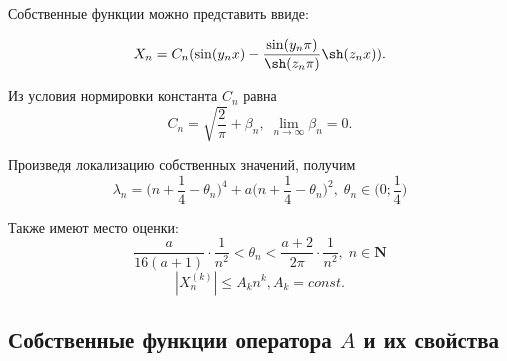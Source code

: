 \documentclass[ignorenonframetext,unicode,handout, 9pt]{beamer}
\numberwithin{equation}{section}
\begin{document}

\begin{frame}

Собственные функции можно представить ввиде:

\begin{equation}
X_n = C_n (\sin(y_n x) - \frac{\sin(y_n \pi)}{\sh(z_n \pi)} \sh(z_n x)).
\end{equation}

Из условия нормировки константа $C_n$ равна
\begin{equation}\label{Cn}
C_n = \sqrt{\frac{2}{\pi}} + \beta_n, \; \lim_{n \rightarrow \infty}\beta_n = 0.
\end{equation}

Произведя локализацию собственных значений, получим
\begin{equation}\label{ln}
  \lambda_n = \bigg(n + \frac{1}{4} - \theta_n\bigg)^4 + a\bigg(n + \frac{1}{4} - \theta_n\bigg)^2,\;\theta_n \in \bigg(0;\frac{1}{4}\bigg)
\end{equation}

Также имеют место оценки:
\begin{equation}\label{thet}
 \frac{a}{16(a + 1)} \cdot \frac{1}{n^2} < \theta_n < \frac{a+ 2}{2 \pi} \cdot \frac{1}{n^2},\; n \in \textbf{N}
\end{equation}
\begin{equation}\label{Xnk}
  |X_n^{(k)}| \leqslant A_k n^k, A_k = const.
\end{equation}


\end{frame}


\subsection{Собственные функции оператора $A$ и их свойства}
\end{document}
